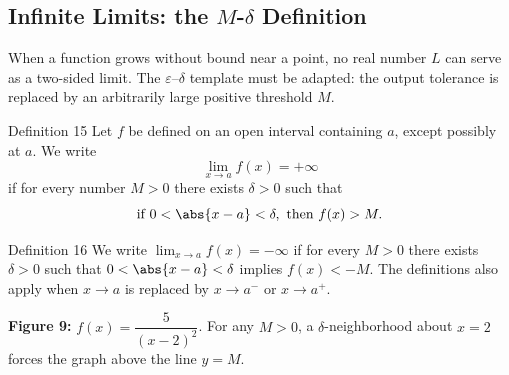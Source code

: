 \subsection*{Infinite Limits: the \texorpdfstring{\(M\)-\(\delta\)}{M-delta} Definition}
\label{subsec:1.4.5}

When a function grows without bound near a point, no real number \(L\) can serve as a two-sided limit. The \(\varepsilon\)--\(\delta\) template must be adapted: the output tolerance is replaced by an arbitrarily large positive threshold \(M\).

\begin{definitionbox}{Definition 15}
Let \(f\) be defined on an open interval containing \(a\), except possibly at \(a\). We write
\[
\lim_{x \to a} f(x) = +\infty
\]
if for every number \(M > 0\) there exists \(\delta > 0\) such that
\[
\text{if } 0 < \abs{x - a} < \delta,\text{ then } f(x) > M.
\]
\end{definitionbox}

\begin{definitionbox}{Definition 16}
We write \(\lim_{x \to a} f(x) = -\infty\) if for every \(M > 0\) there exists \(\delta > 0\) such that \(0 < \abs{x - a} < \delta\) implies \(f(x) < -M\). The definitions also apply when \(x \to a\) is replaced by \(x \to a^{-}\) or \(x \to a^{+}\).
\end{definitionbox}

\begin{center}

\smallskip
\textbf{Figure 9:} \(f(x) = \dfrac{5}{(x-2)^{2}}\). For any \(M > 0\), a \(\delta\)-neighborhood about \(x = 2\) forces the graph above the line \(y = M\).
\end{center}

